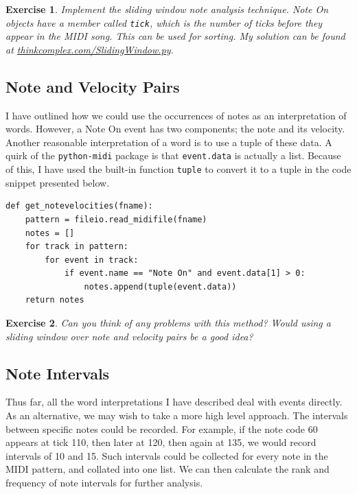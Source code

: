 \documentclass[10pt]{book}
\newtheorem{exercise}{Exercise}[chapter]
\begin{document}
\begin{exercise}
Implement the sliding window note analysis technique. Note On objects have a member called \texttt{tick}, which is the number of ticks before they appear in the MIDI song. This can be used for sorting. My solution can be found at \url{thinkcomplex.com/SlidingWindow.py}.
\end{exercise}


\subsection{Note and Velocity Pairs}
I have outlined how we could use the occurrences of notes as an interpretation of words. However, a Note On event has two components; the note and its velocity. Another reasonable interpretation of a word is to use a tuple of these data. A quirk of the \texttt{python-midi} package is that \texttt{event.data} is actually a list. Because of this, I have used the built-in function \texttt{tuple} to convert it to a tuple in the code snippet presented below.

\begin{verbatim}
def get_notevelocities(fname):
    pattern = fileio.read_midifile(fname)
    notes = []
    for track in pattern:
        for event in track:
            if event.name == "Note On" and event.data[1] > 0:
                notes.append(tuple(event.data))
    return notes
\end{verbatim}


\begin{exercise}
Can you think of any problems with this method? Would using a sliding window over note and velocity pairs be a good idea?
\end{exercise}



\subsection{Note Intervals}
Thus far, all the word interpretations I have described deal with events directly. As an alternative, we may wish to take a more high level approach. The intervals between specific notes could be recorded. For example, if the note code 60 appears at tick 110, then later at 120, then again at 135, we would record intervals of 10 and 15. Such intervals could be collected for every note in the MIDI pattern, and collated into one list. We can then calculate the rank and frequency of note intervals for further analysis.
\end{document}
